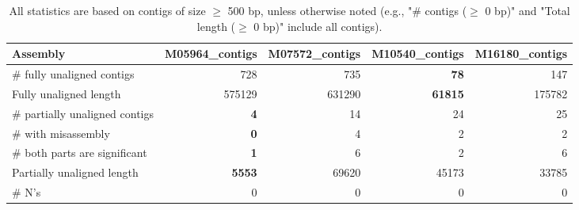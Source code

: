 \documentclass[12pt,a4paper]{article}
\begin{document}
\begin{table}[ht]
\begin{center}
\caption{All statistics are based on contigs of size $\geq$ 500 bp, unless otherwise noted (e.g., "\# contigs ($\geq$ 0 bp)" and "Total length ($\geq$ 0 bp)" include all contigs).}
\begin{tabular}{|l*{4}{|r}|}
\hline
Assembly & M05964\_contigs & M07572\_contigs & M10540\_contigs & M16180\_contigs \\ \hline
\# fully unaligned contigs & 728 & 735 & {\bf 78} & 147 \\ \hline
Fully unaligned length & 575129 & 631290 & {\bf 61815} & 175782 \\ \hline
\# partially unaligned contigs & {\bf 4} & 14 & 24 & 25 \\ \hline
\hspace{5mm}\# with misassembly & {\bf 0} & 4 & 2 & 2 \\ \hline
\hspace{5mm}\# both parts are significant & {\bf 1} & 6 & 2 & 6 \\ \hline
Partially unaligned length & {\bf 5553} & 69620 & 45173 & 33785 \\ \hline
\# N's & 0 & 0 & 0 & 0 \\ \hline
\end{tabular}
\end{center}
\end{table}
\end{document}
